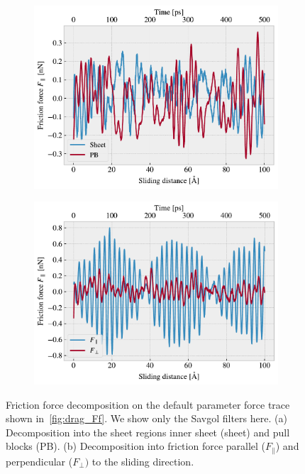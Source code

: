\begin{figure}[!htb]
  \centering
  \begin{subfigure}[t]{0.49\textwidth}
    \centering
    \includegraphics[width=\textwidth]{figures/baseline/decomp_group.pdf}
    \caption{}
    \label{fig:decomp_group}
  \end{subfigure}
  \hfill
  \begin{subfigure}[t]{0.49\textwidth}
      \centering
      \includegraphics[width=\textwidth]{figures/baseline/decomp_direc.pdf}
      \caption{}
      \label{fig:decomp_direc}
  \end{subfigure}
  \caption{Friction force decomposition on the default parameter force trace shown in~\cref{fig:drag_Ff}. We show only the Savgol filters here. (a) Decomposition into the sheet regions inner sheet (sheet) and pull blocks (PB). (b) Decomposition into friction force parallel ($F_{\parallel}$) and perpendicular ($F_{\perp})$ to the sliding direction.}
  \label{fig:decomp}
\end{figure}


